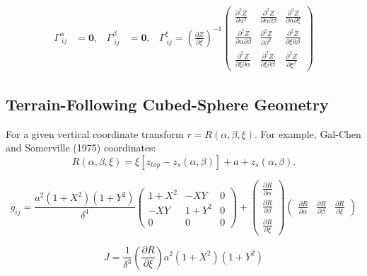 \documentclass{article}
\newcommand{\vb}{\mathbf}
\newcommand{\pdiff}[2]{\frac{\partial #1}{\partial #2}}
\begin{document}
\begin{align}
\Gamma^{\alpha}_{\ i j} &= \vb{0}, & \Gamma^{\beta}_{\ i j} &= \vb{0}, & \Gamma^{\xi}_{\ i j} = \left( \pdiff{Z}{\xi} \right)^{-1} \left( \begin{array}{ccc} \frac{\partial^2 Z}{\partial \alpha^2} & \frac{\partial^2 Z}{\partial \alpha \partial \beta} & \frac{\partial^2 Z}{\partial \alpha \partial \xi} \\[2.0ex] \frac{\partial^2 Z}{\partial \alpha \partial \beta} & \frac{\partial^2 Z}{\partial \beta^2} & \frac{\partial^2 Z}{\partial \xi \partial \beta} \\[2.0ex] \frac{\partial^2 Z}{\partial \xi \partial \alpha} & \frac{\partial^2 Z}{\partial \xi \partial \beta} & \frac{\partial^2 Z}{\partial \xi^2} \end{array} \right) 
\end{align}

\subsection{Terrain-Following Cubed-Sphere Geometry}

For a given vertical coordinate transform $r = R(\alpha, \beta, \xi)$.  For example, Gal-Chen and Somerville (1975) coordinates:
\begin{equation}
R(\alpha, \beta, \xi) = \xi \left[ z_{top} - z_s(\alpha, \beta) \right] + a + z_s(\alpha, \beta).
\end{equation}

\begin{equation}
g_{ij} = \frac{a^2 (1+X^2) (1+Y^2)}{\delta^4} \left( \begin{array}{ccc} 1+X^2 & - X Y & 0 \\[2.0ex] - X Y & 1+Y^2 & 0 \\[2.0ex] 0 & 0 & 0 \end{array} \right) + \left( \begin{array}{c} \pdiff{R}{\alpha} \\[2.0ex] \pdiff{R}{\beta} \\[2.0ex] \pdiff{R}{\xi} \end{array} \right) \left( \begin{array}{ccc} \pdiff{R}{\alpha} & \pdiff{R}{\beta} & \pdiff{R}{\xi} \end{array} \right)
\end{equation}

\begin{equation}
J = \frac{1}{\delta^3} \left( \pdiff{R}{\xi} \right) a^2 (1+X^2) (1+Y^2)
\end{equation}
\end{document}
